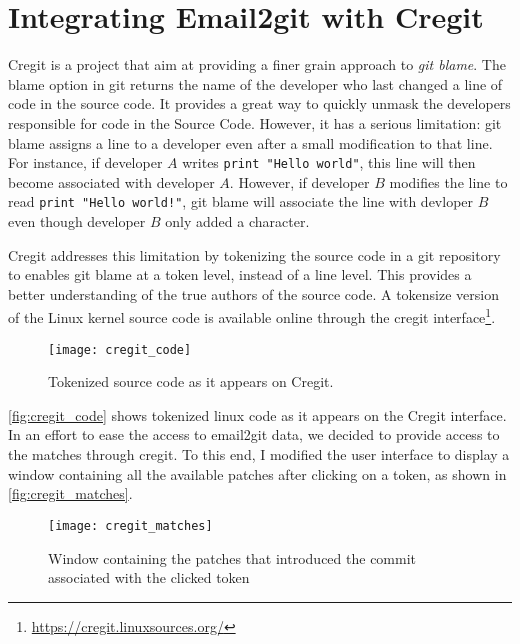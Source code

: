 \section{Integrating Email2git with Cregit}

Cregit is a project that aim at providing a finer grain approach to \textit{git blame}. The blame option in git returns the name of the developer who last changed a line of code in the source code. It provides a great way to quickly unmask the developers responsible for code in the Source Code. However, it has a serious limitation: git blame assigns a line to a developer even after a small modification to that line. For instance, if developer $A$ writes \texttt{print "Hello world"}, this line will then become associated with developer $A$. However, if developer $B$ modifies the line to read \texttt{print "Hello world!"}, git blame will associate the line with devloper $B$ even though developer $B$ only added a character. 

Cregit addresses this limitation by tokenizing the source code in a git repository to enables git blame at a token level, instead of a line level. This provides a better understanding of the true authors of the source code. A tokensize version of the Linux kernel source code is available online through the cregit interface\footnote{\url{https://cregit.linuxsources.org/}}.

\begin{figure}[htb]
\centering
\texttt{[image: cregit\_code]}
\caption{Tokenized source code as it appears on Cregit.}
\label{fig:cregit_code}
\end{figure}

\autoref{fig:cregit_code} shows tokenized linux code as it appears on the Cregit interface. In an effort to ease the access to email2git data, we decided to provide access to the matches through cregit. To this end, I modified the user interface to display a window containing all the available patches after clicking on a token, as shown in \autoref{fig:cregit_matches}. 

\begin{figure}[htb]
\centering
\texttt{[image: cregit\_matches]}
\caption{Window containing the patches that introduced the commit associated with the clicked token}
\label{fig:cregit_matches}
\end{figure}

